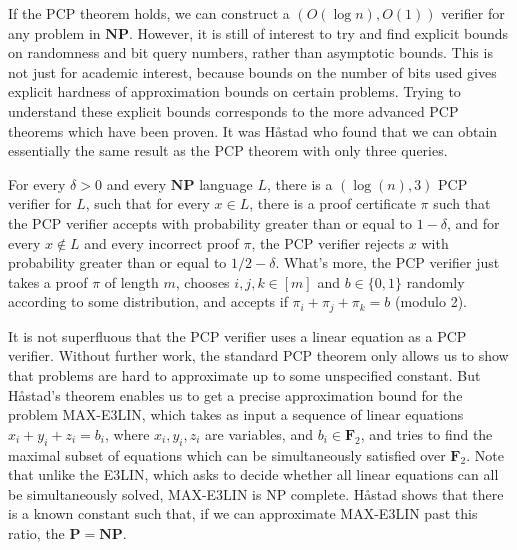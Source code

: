 If the PCP theorem holds, we can construct a $(O(\log n), O(1))$ verifier for any problem in $\mathbf{NP}$. However, it is still of interest to try and find explicit bounds on randomness and bit query numbers, rather than asymptotic bounds. This is not just for academic interest, because bounds on the number of bits used gives explicit hardness of approximation bounds on certain problems. Trying to understand these explicit bounds corresponds to the more advanced PCP theorems which have been proven. It was Håstad who found that we can obtain essentially the same result as the PCP theorem with only three queries.

\begin{theorem}
    For every $\delta > 0$ and every $\mathbf{NP}$ language $L$, there is a $(\log (n), 3)$ PCP verifier for $L$, such that for every $x \in L$, there is a proof certificate $\pi$ such that the PCP verifier accepts with probability greater than or equal to $1 - \delta$, and for every $x \not \in L$ and every incorrect proof $\pi$, the PCP verifier rejects $x$ with probability greater than or equal to $1/2 - \delta$. What's more, the PCP verifier just takes a proof $\pi$ of length $m$, chooses $i,j,k \in [m]$ and $b \in \{ 0, 1 \}$ randomly according to some distribution, and accepts if $\pi_i + \pi_j + \pi_k = b$ (modulo 2).
\end{theorem}

It is not superfluous that the PCP verifier uses a linear equation as a PCP verifier. Without further work, the standard PCP theorem only allows us to show that problems are hard to approximate up to some unspecified constant. But Håstad's theorem enables us to get a precise approximation bound for the problem MAX-E3LIN, which takes as input a sequence of linear equations $x_i + y_i + z_i = b_i$, where $x_i, y_i, z_i$ are variables, and $b_i \in \mathbf{F}_2$, and tries to find the maximal subset of equations which can be simultaneously satisfied over $\mathbf{F}_2$. Note that unlike the E3LIN, which asks to decide whether all linear equations can all be simultaneously solved, MAX-E3LIN is NP complete. Håstad shows that there is a known constant such that, if we can approximate MAX-E3LIN past this ratio, the $\mathbf{P} = \mathbf{NP}$.

